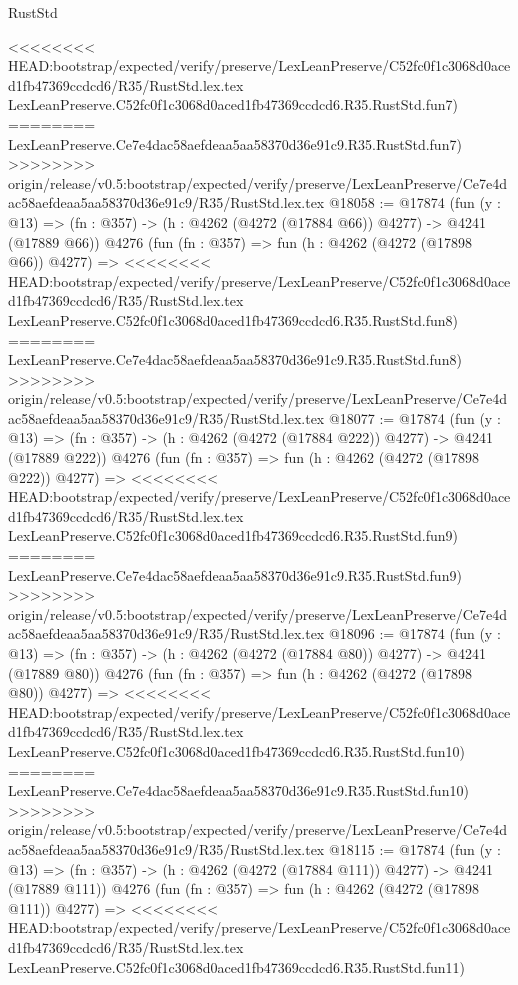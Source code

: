 \begin{lexlean}{RustStd}
\begin{coremodule}
{\begin{coremodule}
{{{{{{{{{{{{{{{{<<<<<<<< HEAD:bootstrap/expected/verify/preserve/LexLeanPreserve/C52fc0f1c3068d0aced1fb47369ccdcd6/R35/RustStd.lex.tex
    LexLeanPreserve.C52fc0f1c3068d0aced1fb47369ccdcd6.R35.RustStd.fun7)
========
    LexLeanPreserve.Ce7e4dac58aefdeaa5aa58370d36e91c9.R35.RustStd.fun7)
>>>>>>>> origin/release/v0.5:bootstrap/expected/verify/preserve/LexLeanPreserve/Ce7e4dac58aefdeaa5aa58370d36e91c9/R35/RustStd.lex.tex
@18058 := @17874
    (fun (y : @13) => (fn : @357) -> (h : @4262 (@4272 (@17884 @66)) @4277) -> @4241 (@17889 @66))
    @4276
    (fun (fn : @357) =>
    fun (h : @4262 (@4272 (@17898 @66)) @4277) =>
<<<<<<<< HEAD:bootstrap/expected/verify/preserve/LexLeanPreserve/C52fc0f1c3068d0aced1fb47369ccdcd6/R35/RustStd.lex.tex
    LexLeanPreserve.C52fc0f1c3068d0aced1fb47369ccdcd6.R35.RustStd.fun8)
========
    LexLeanPreserve.Ce7e4dac58aefdeaa5aa58370d36e91c9.R35.RustStd.fun8)
>>>>>>>> origin/release/v0.5:bootstrap/expected/verify/preserve/LexLeanPreserve/Ce7e4dac58aefdeaa5aa58370d36e91c9/R35/RustStd.lex.tex
@18077 := @17874
    (fun (y : @13) => (fn : @357) -> (h : @4262 (@4272 (@17884 @222)) @4277) -> @4241 (@17889 @222))
    @4276
    (fun (fn : @357) =>
    fun (h : @4262 (@4272 (@17898 @222)) @4277) =>
<<<<<<<< HEAD:bootstrap/expected/verify/preserve/LexLeanPreserve/C52fc0f1c3068d0aced1fb47369ccdcd6/R35/RustStd.lex.tex
    LexLeanPreserve.C52fc0f1c3068d0aced1fb47369ccdcd6.R35.RustStd.fun9)
========
    LexLeanPreserve.Ce7e4dac58aefdeaa5aa58370d36e91c9.R35.RustStd.fun9)
>>>>>>>> origin/release/v0.5:bootstrap/expected/verify/preserve/LexLeanPreserve/Ce7e4dac58aefdeaa5aa58370d36e91c9/R35/RustStd.lex.tex
@18096 := @17874
    (fun (y : @13) => (fn : @357) -> (h : @4262 (@4272 (@17884 @80)) @4277) -> @4241 (@17889 @80))
    @4276
    (fun (fn : @357) =>
    fun (h : @4262 (@4272 (@17898 @80)) @4277) =>
<<<<<<<< HEAD:bootstrap/expected/verify/preserve/LexLeanPreserve/C52fc0f1c3068d0aced1fb47369ccdcd6/R35/RustStd.lex.tex
    LexLeanPreserve.C52fc0f1c3068d0aced1fb47369ccdcd6.R35.RustStd.fun10)
========
    LexLeanPreserve.Ce7e4dac58aefdeaa5aa58370d36e91c9.R35.RustStd.fun10)
>>>>>>>> origin/release/v0.5:bootstrap/expected/verify/preserve/LexLeanPreserve/Ce7e4dac58aefdeaa5aa58370d36e91c9/R35/RustStd.lex.tex
@18115 := @17874
    (fun (y : @13) => (fn : @357) -> (h : @4262 (@4272 (@17884 @111)) @4277) -> @4241 (@17889 @111))
    @4276
    (fun (fn : @357) =>
    fun (h : @4262 (@4272 (@17898 @111)) @4277) =>
<<<<<<<< HEAD:bootstrap/expected/verify/preserve/LexLeanPreserve/C52fc0f1c3068d0aced1fb47369ccdcd6/R35/RustStd.lex.tex
    LexLeanPreserve.C52fc0f1c3068d0aced1fb47369ccdcd6.R35.RustStd.fun11)
}}}}}}}}}}}}}}}}
\end{coremodule}}
\end{coremodule}
\end{lexlean}
